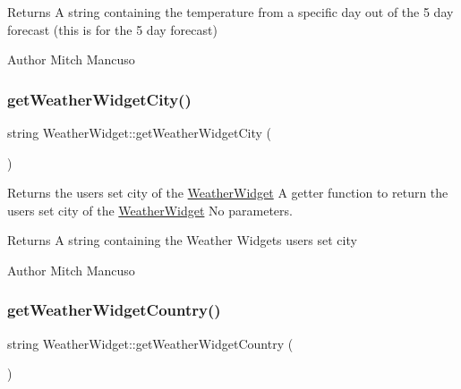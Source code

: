 \begin{DoxyReturn}{Returns}
A string containing the temperature from a specific day out of the 5 day forecast (this is for the 5 day forecast) 
\end{DoxyReturn}
\begin{DoxyAuthor}{Author}
Mitch Mancuso 
\end{DoxyAuthor}
\mbox{\label{class_weather_widget_adb2d06c824ce9ad1f3c7a52bbe609177}} 
\subsubsection{\texorpdfstring{get\+Weather\+Widget\+City()}{getWeatherWidgetCity()}}
{\footnotesize\ttfamily string Weather\+Widget\+::get\+Weather\+Widget\+City (\begin{DoxyParamCaption}{ }\end{DoxyParamCaption})}



Returns the user\textquotesingle{}s set city of the \mbox{\hyperlink{class_weather_widget}{Weather\+Widget}}  A getter function to return the user\textquotesingle{}s set city of the \mbox{\hyperlink{class_weather_widget}{Weather\+Widget}}  No parameters. 

\begin{DoxyReturn}{Returns}
A string containing the Weather Widget\textquotesingle{}s user\textquotesingle{}s set city 
\end{DoxyReturn}
\begin{DoxyAuthor}{Author}
Mitch Mancuso 
\end{DoxyAuthor}
\mbox{\label{class_weather_widget_a1c31534566187d4dfc82014ac123ebcb}} 
\subsubsection{\texorpdfstring{get\+Weather\+Widget\+Country()}{getWeatherWidgetCountry()}}
{\footnotesize\ttfamily string Weather\+Widget\+::get\+Weather\+Widget\+Country (\begin{DoxyParamCaption}{ }\end{DoxyParamCaption})}



